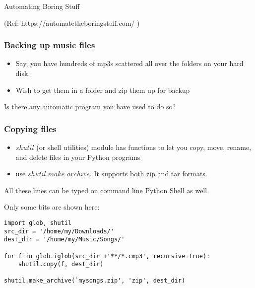 \begin{frame}[fragile]\frametitle{}
\begin{center}
{\Large Automating Boring Stuff}

\tiny{ (Ref: https://automatetheboringstuff.com/ )}
\end{center}


\end{frame}


\begin{frame}[fragile]\frametitle{Backing up music files}
\begin{itemize}
\item Say, you have hundreds of mp3s scattered all over the folders on your hard disk.
\item Wish to get them in a folder and zip them up for backup
\end{itemize}
Is there any automatic program you have used to do so?
\end{frame}

\begin{frame}[fragile]\frametitle{Copying files}
\begin{itemize}
\item $shutil$ (or shell utilities) module has functions to let you copy, move, rename, and delete files in your Python programs
\item use $shutil.make\_archive$. It supports both zip and tar formats.
\end{itemize}

All these lines can be typed on command line Python Shell as well.


Only some bits are shown here:
\begin{lstlisting}
import glob, shutil 
src_dir = '/home/my/Downloads/'
dest_dir = '/home/my/Music/Songs/'

for f in glob.iglob(src_dir +'**/*.cmp3', recursive=True):
    shutil.copy(f, dest_dir)
    
shutil.make_archive(`mysongs.zip', 'zip', dest_dir)
\end{lstlisting}
\end{frame}